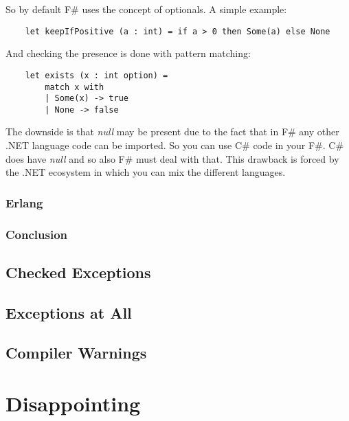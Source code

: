 \documentclass[a4paper,12pt]{report}
\begin{document}
So by default F\# uses the concept of optionals\cite{optional-in-fsharp}. A simple example:

\begin{verbatim}
    let keepIfPositive (a : int) = if a > 0 then Some(a) else None
\end{verbatim}

And checking the presence is done with pattern matching:

\begin{verbatim}
    let exists (x : int option) =
        match x with
        | Some(x) -> true
        | None -> false
\end{verbatim}

The downside is that \textit{null} may be present due to the fact that in F\# any other .NET language code can be imported. So you can use C\# code in your F\#. C\# does have \textit{null} and so also F\# must deal with that. This drawback is forced by the .NET ecosystem in which you can mix the different languages.

\subsubsection{Erlang}

\subsubsection{Conclusion}

\subsection{Checked Exceptions}


\subsection{Exceptions at All}


\subsection{Compiler Warnings}


\section{Disappointing}
\end{document}
